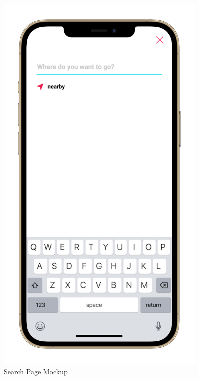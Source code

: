 \begin{figure}
    \centering
    \begin{minipage}{.45\linewidth}
    \includegraphics[width=0.9\textwidth]{Images/UserInterfaces/withiphonephrames/SearchPage_iphone12promaxgold_portrait.png}
    \caption{\label{fig:InterfacesDiagram}{Search Page Mockup}}
\end{minipage}
\hspace{.05\linewidth}
\begin{minipage}{.45\linewidth}

\end{minipage}
\end{figure}
